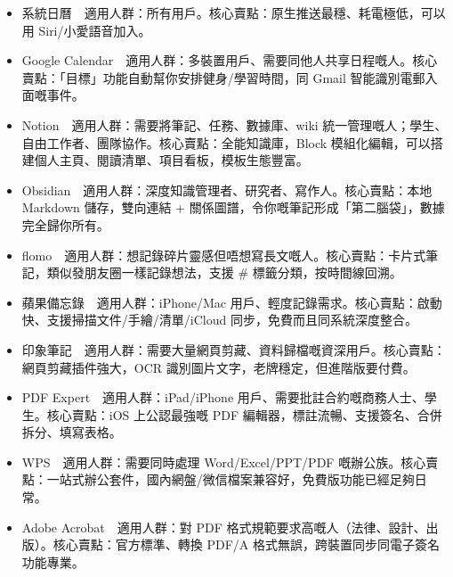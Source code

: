 
\begin{itemize}
  \item 系統日曆　適用人群：所有用戶。核心賣點：原生推送最穩、耗電極低，可以用 Siri/小愛語音加入。
  \item Google Calendar　適用人群：多裝置用戶、需要同他人共享日程嘅人。核心賣點：「目標」功能自動幫你安排健身/學習時間，同 Gmail 智能識別電郵入面嘅事件。
\end{itemize}


\begin{itemize}
  \item Notion　適用人群：需要將筆記、任務、數據庫、wiki 統一管理嘅人；學生、自由工作者、團隊協作。核心賣點：全能知識庫，Block 模組化編輯，可以搭建個人主頁、閱讀清單、項目看板，模板生態豐富。
  \item Obsidian　適用人群：深度知識管理者、研究者、寫作人。核心賣點：本地 Markdown 儲存，雙向連結 + 關係圖譜，令你嘅筆記形成「第二腦袋」，數據完全歸你所有。
  \item flomo　適用人群：想記錄碎片靈感但唔想寫長文嘅人。核心賣點：卡片式筆記，類似發朋友圈一樣記錄想法，支援 \# 標籤分類，按時間線回溯。
  \item 蘋果備忘錄　適用人群：iPhone/Mac 用戶、輕度記錄需求。核心賣點：啟動快、支援掃描文件/手繪/清單/iCloud 同步，免費而且同系統深度整合。
  \item 印象筆記　適用人群：需要大量網頁剪藏、資料歸檔嘅資深用戶。核心賣點：網頁剪藏插件強大，OCR 識別圖片文字，老牌穩定，但進階版要付費。
\end{itemize}


\begin{itemize}
  \item PDF Expert　適用人群：iPad/iPhone 用戶、需要批註合約嘅商務人士、學生。核心賣點：iOS 上公認最強嘅 PDF 編輯器，標註流暢、支援簽名、合併拆分、填寫表格。
  \item WPS　適用人群：需要同時處理 Word/Excel/PPT/PDF 嘅辦公族。核心賣點：一站式辦公套件，國內網盤/微信檔案兼容好，免費版功能已經足夠日常。
  \item Adobe Acrobat　適用人群：對 PDF 格式規範要求高嘅人（法律、設計、出版）。核心賣點：官方標準、轉換 PDF/A 格式無誤，跨裝置同步同電子簽名功能專業。
\end{itemize}


